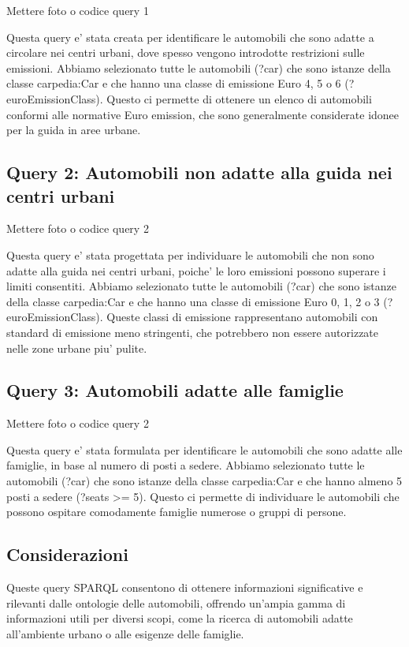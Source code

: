 Mettere foto o codice query 1

Questa query e' stata creata per identificare le automobili che sono adatte a circolare nei centri urbani,
dove spesso vengono introdotte restrizioni sulle emissioni.
Abbiamo selezionato tutte le automobili (?car) che sono istanze della classe carpedia:Car e che hanno una
classe di emissione Euro 4, 5 o 6 (?euroEmissionClass).
Questo ci permette di ottenere un elenco di automobili conformi alle normative Euro emission, che sono generalmente
considerate idonee per la guida in aree urbane.

\subsection{Query 2: Automobili non adatte alla guida nei centri urbani}

Mettere foto o codice query 2

Questa query e' stata progettata per individuare le automobili che non sono adatte alla guida nei centri urbani,
poiche' le loro emissioni possono superare i limiti consentiti.
Abbiamo selezionato tutte le automobili (?car) che sono istanze della classe carpedia:Car e che hanno una
classe di emissione Euro 0, 1, 2 o 3 (?euroEmissionClass).
Queste classi di emissione rappresentano automobili con standard di emissione meno stringenti,
che potrebbero non essere autorizzate nelle zone urbane piu' pulite.

\subsection{Query 3: Automobili adatte alle famiglie}

Mettere foto o codice query 2

Questa query e' stata formulata per identificare le automobili che sono adatte alle famiglie, in base al numero
di posti a sedere. Abbiamo selezionato tutte le automobili (?car) che sono istanze della classe carpedia:Car e
che hanno almeno 5 posti a sedere (?seats >= 5). Questo ci permette di individuare le automobili che possono
ospitare comodamente famiglie numerose o gruppi di persone.

\subsection{Considerazioni}
Queste query SPARQL consentono di ottenere informazioni significative e rilevanti dalle ontologie delle automobili,
offrendo un'ampia gamma di informazioni utili per diversi scopi, come la ricerca di automobili adatte all'ambiente
urbano o alle esigenze delle famiglie.
